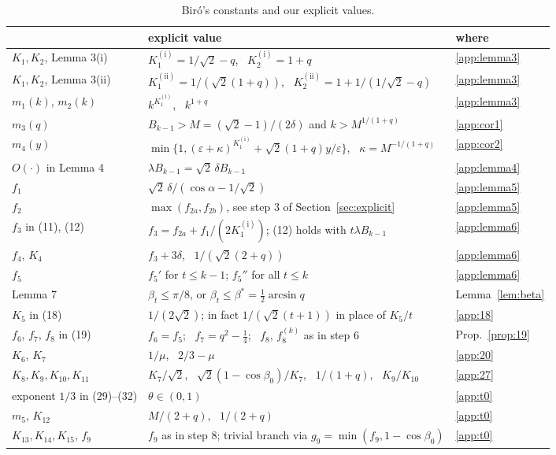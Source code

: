 \documentclass[11pt]{amsart}
\theoremstyle{remark}
\theoremstyle{plain}
\newcommand{\eps}{\varepsilon}
\newcommand{\Ka}{K_1^{(\mathrm{i})}}
\newcommand{\Kb}{K_2^{(\mathrm{i})}}
\newcommand{\Kc}{K_1^{(\mathrm{ii})}}
\newcommand{\Kd}{K_2^{(\mathrm{ii})}}
\begin{document}
\begin{table}[ht]
\centering\small
\caption{Bir\'o's constants and our explicit values.}\label{tab:constants}
\renewcommand{\arraystretch}{1.25}
\begin{tabular}{p{3.2cm}p{9.3cm}l}
\toprule
\cite{Bir00b} & explicit value & where\\
\midrule
$K_1,K_2$, Lemma 3(i) & $\Ka=1/\sqrt2-q$, \ $\Kb=1+q$ & \ref{app:lemma3}\\
$K_1,K_2$, Lemma 3(ii) & $\Kc=1/(\sqrt2(1+q))$, \ $\Kd=1+1/(1/\sqrt2-q)$ & \ref{app:lemma3}\\
$m_1(k)$, $m_2(k)$ & $k^{\Ka}$, \ $k^{1+q}$ & \ref{app:lemma3}\\
$m_3(q)$ & $B_{k-1}>M=(\sqrt2-1)/(2\delta)$ and $k>M^{1/(1+q)}$ & \ref{app:cor1}\\
$m_4(y)$ & $\min\{1,(\eps+\kappa)^{\Ka}+\sqrt2(1+q)y/\eps\}$, \ $\kappa=M^{-1/(1+q)}$ & \ref{app:cor2}\\
$O(\cdot)$ in Lemma 4 & $\lambda B_{k-1}=\sqrt2\,\delta B_{k-1}$ & \ref{app:lemma4}\\
$f_1$ & $\sqrt2\,\delta/(\cos\alpha-1/\sqrt2)$ & \ref{app:lemma5}\\
$f_2$ & $\max(f_{2a},f_{2b})$, see step 3 of Section~\ref{sec:explicit} & \ref{app:lemma5}\\
$f_3$ in (11), (12) & $f_3=f_{2a}+f_1/(2\Ka)$; (12) holds with $t\lambda B_{k-1}$ & \ref{app:lemma6}\\
$f_4$, $K_4$ & $f_3+3\delta$, \ $1/(\sqrt2(2+q))$ & \ref{app:lemma6}\\
$f_5$ & $f_5'$ for $t\le k-1$; $f_5''$ for all $t\le k$ & \ref{app:lemma6}\\
Lemma 7 & $\beta_t\le\pi/8$, or $\beta_t\le\beta^*=\frac12\arcsin q$ & Lemma~\ref{lem:beta}\\
$K_5$ in (18) & $1/(2\sqrt2)$; in fact $1/(\sqrt2(t+1))$ in place of $K_5/t$ & \ref{app:18}\\
$f_6$, $f_7$, $f_8$ in (19) & $f_6=f_5$; \ $f_7=q^2-\frac14$; \ $f_8$, $f_8^{(k)}$ as in step 6 & Prop.~\ref{prop:19}\\
$K_6$, $K_7$ & $1/\mu$, \ $2/3-\mu$ & \ref{app:20}\\
$K_8,K_9,K_{10},K_{11}$ & $K_7/\sqrt2$, \ $\sqrt2(1-\cos\beta_0)/K_7$, \ $1/(1+q)$, \ $K_9/K_{10}$ & \ref{app:27}\\
exponent $1/3$ in (29)--(32) & $\theta\in(0,1)$ & \ref{app:t0}\\
$m_5$, $K_{12}$ & $M/(2+q)$, \ $1/(2+q)$ & \ref{app:t0}\\
$K_{13},K_{14},K_{15}$, $f_9$ & $f_9$ as in step 8; trivial branch via $g_9=\min(f_9,1-\cos\beta_0)$ & \ref{app:t0}\\

\end{tabular}
\end{table}
\end{document}
